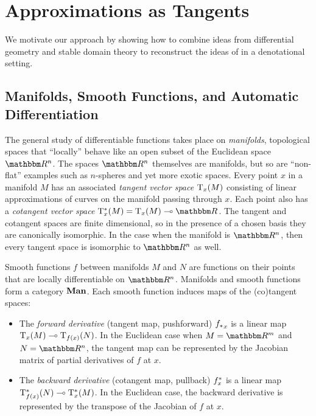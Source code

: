 \section{Approximations as Tangents}
\label{sec:approx-as-tangents}

We motivate our approach by showing how to combine ideas from differential geometry and stable domain theory to reconstruct the ideas of \GPS in a denotational setting.

\subsection{Manifolds, Smooth Functions, and Automatic Differentiation}
\label{sec:approx-as-tangents:autodiff}


The general study of differentiable functions takes place on
\emph{manifolds}, topological spaces that ``locally'' behave like an
open subset of the Euclidean space $\RR^n$. The spaces $\RR^n$
themselves are manifolds, but so are ``non-flat'' examples such as
$n$-spheres and yet more exotic spaces. Every point $x$ in a manifold
$M$ has an associated \emph{tangent vector space} $\mathrm{T}_x(M)$
consisting of linear approximations of curves on the manifold passing
through $x$. Each point also has a \emph{cotangent vector space}
$\cotangents_x(M) = \tangents_x(M) \linearto \RR$. The tangent and
cotangent spaces are finite dimensional, so in the presence of a
chosen basis they are canonically isomorphic. In the case when the
manifold is $\RR^n$, then every tangent space is isomorphic to $\RR^n$
as well.

Smooth functions $f$ between manifolds $M$ and $N$ are functions on their points that are locally differentiable on $\RR^n$. Manifolds and smooth functions form a category $\mathbf{Man}$. Each smooth function induces maps of the (co)tangent spaces:
\begin{itemize}[leftmargin=\enummargin]
\item The \emph{forward derivative} (tangent map, pushforward) ${f_{*}}_x$ is a linear map $\mathrm{T}_x(M) \multimap \mathrm{T}_{f(x)}(N)$. In the Euclidean case when $M = \RR^m$ and $N = \RR^n$, the tangent map can be represented by the Jacobian matrix of partial derivatives of $f$ at $x$.
\item The \emph{backward derivative} (cotangent map, pullback) $f^{*}_x$ is a linear map $\mathrm{T}^*_{f(x)}(N) \multimap \mathrm{T}^*_x(M)$. In the Euclidean case, the backward derivative is represented by the transpose of the Jacobian of $f$ at $x$.
\end{itemize}

